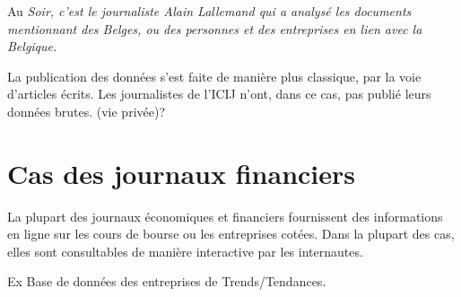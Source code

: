 Au \em Soir\em, c'est le journaliste Alain Lallemand qui a analysé les documents mentionnant des Belges, ou des personnes et des entreprises en lien avec la Belgique.

La publication des données s'est faite de manière plus classique, par la voie d'articles écrits. Les journalistes de l'ICIJ n'ont, dans ce cas, pas publié leurs données brutes. (vie privée)?

\section{Cas des journaux financiers}

La plupart des journaux économiques et financiers fournissent des informations en ligne sur les cours de bourse ou les entreprises cotées. Dans la plupart des cas, elles sont consultables de manière interactive par les internautes.

Ex Base de données des entreprises de Trends/Tendances.
